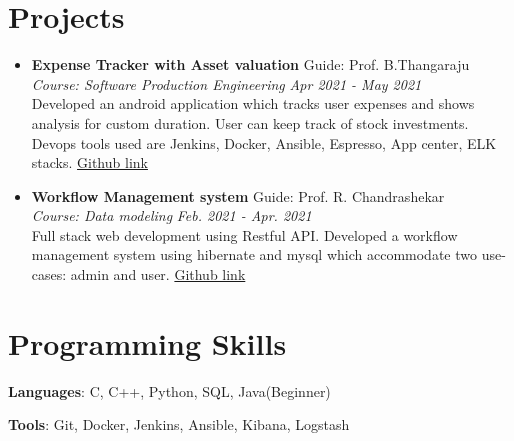 \documentclass[letterpaper,11pt]{article}
\makeatletter
\newcommand{\resumeItem}[2]{
  \item\small{
    {#1}\hfill{#2}%
  }
}
\newcommand{\resumeSubheading}[4]{
\item\textbf{#1} \hfill #2\null\\
 \textit{\small#3} \hfill \textit{\small#4}%
}
\newcommand{\resumeSubItem}[2]{\resumeItem{#1}\hfill{#2}}
\newcommand{\resumeSubHeadingListStart}{\begin{itemize}[leftmargin=*]}
\newcommand{\resumeSubHeadingListEnd}{\end{itemize}}
\makeatother
\begin{document}
\section{Projects}
  \resumeSubHeadingListStart
    \resumeSubheading
    {Expense Tracker with Asset valuation}{Guide: Prof. B.Thangaraju}
    {Course: Software Production Engineering}{Apr 2021 - May 2021}\\
    Developed an android application which tracks user expenses and shows analysis for custom duration. User can keep track of stock investments. Devops tools used are Jenkins, Docker, Ansible, Espresso, App center, ELK stacks. \href{https://github.com/printSamarth/ExpenseTracker}{Github link}
    \resumeSubheading
    {Workflow Management system}{Guide: Prof. R. Chandrashekar}
    {Course: Data modeling}{Feb. 2021 - Apr. 2021}\\
    Full stack web development using Restful API. Developed a workflow management system using hibernate and mysql which accommodate two use-cases: admin and user. \href{https://github.com/shivam228/DM-project-with-front-endss}{Github link}  
   \
  \resumeSubHeadingListEnd

%
\section{Programming Skills}
 \resumeSubHeadingListStart
   \item{
     \textbf{Languages}{: C, C++, Python, SQL, Java(Beginner)}
     \\
     \item{\textbf{Tools}{: Git, Docker, Jenkins, Ansible, Kibana, Logstash}
   }}
 \resumeSubHeadingListEnd
\end{document}
